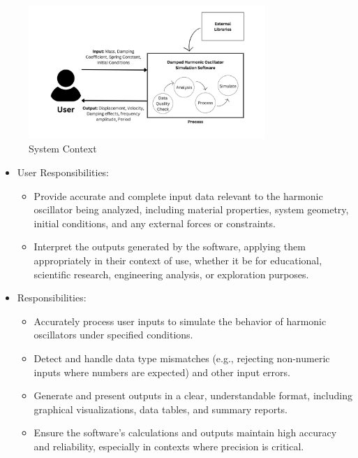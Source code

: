 \documentclass[12pt]{article}
\begin{document}
\begin{figure}[h!]
\begin{center}
 \includegraphics[width=0.8\textwidth]{./systemContext.png}
\caption{System Context}
\label{Fig_SystemContext} 
\end{center}
\end{figure}

\begin{itemize}
\item User Responsibilities:
  \begin{itemize}
  \item Provide accurate and complete input data relevant to the harmonic 
  oscillator being analyzed, including material properties, system geometry, 
  initial conditions, and any external forces or constraints.
  \item Interpret the outputs generated by the software, applying them 
  appropriately in their context of use, whether it be for educational, 
  scientific research, engineering analysis, or exploration purposes.
  \end{itemize}
\item \progname{} Responsibilities:
  \begin{itemize}
  \item Accurately process user inputs to simulate the behavior of harmonic 
  oscillators under specified conditions.
  \item Detect and handle data type mismatches (e.g., rejecting non-numeric 
  inputs where numbers are expected) and other input errors.
  \item Generate and present outputs in a clear, understandable format, 
  including graphical visualizations, data tables, and summary reports.
  \item Ensure the software's calculations and outputs maintain high accuracy 
  and reliability, especially in contexts where precision is critical.
  \end{itemize}
\end{itemize}
\end{document}
